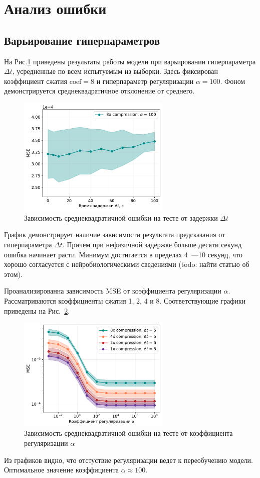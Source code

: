 \documentclass[12pt,twoside]{article}
\begin{document}
\section{Анализ ошибки}
\subsection{Варьирование гиперпараметров}
На Рис.\ref{MSE_dt_main} приведены результаты работы модели при варьировании гиперпараметра $\Delta t$, усредненные по всем испытуемым из выборки. Здесь фиксирован коэффициент сжатия $\mathrm{coef} = 8$ и гиперпараметр регуляризации $\alpha = 100$. Фоном демонстрируется среднеквадратичное отклонение от среднего.
\begin{figure}[h!]
    \centering
    \includegraphics[width=0.65\textwidth]{subs_delta_MSE_dt.pdf}
    \caption{Зависимость среднеквадратичной ошибки на тесте от задержки ${\Delta t}$}
    \label{MSE_dt_main}
\end{figure}
График демонстрирует наличие зависимости результата предсказания от гиперпараметра $\Delta t$. 
Причем при нефизичной задержке больше десяти секунд ошибка начинает расти. 
Минимум достигается в пределах 4~---10 секунд, что хорошо согласуется с нейробиологическими сведениями (todo: найти статью об этом).

Проанализированна зависимость MSE от коэффициента регуляризации $\alpha$.
Рассматриваются коэффициенты сжатия 1, 2, 4 и 8. 
Соответствующие графики приведены на Рис.~\ref{subs_MSE_alpha}.
\begin{figure}[h!]
    \centering
    \includegraphics[width=0.65\textwidth]{subs_MSE_alpha.pdf}
    \caption{Зависимость среднеквадратичной ошибки на тесте от коэффициента регуляризации $\alpha$}
    \label{subs_MSE_alpha}
\end{figure}
Из графиков видно, что отстуствие регуляризации ведет к переобучению модели.
Оптимальное значение коэффициента $\alpha \approx 100$.
\end{document}
